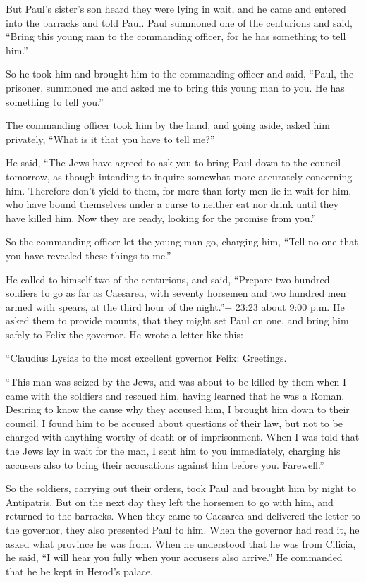  But Paul's sister's son heard they were lying in wait, and
he came and entered into the barracks and told Paul.  Paul
summoned one of the centurions and said, ``Bring this young man to the
commanding officer, for he has something to tell him.''

 So he took him and brought him to the commanding officer
and said, ``Paul, the prisoner, summoned me and asked me to bring this
young man to you. He has something to tell you.''

 The commanding officer took him by the hand, and going
aside, asked him privately, ``What is it that you have to tell me?''

 He said, ``The Jews have agreed to ask you to bring Paul
down to the council tomorrow, as though intending to inquire somewhat
more accurately concerning him.  Therefore don't yield to
them, for more than forty men lie in wait for him, who have bound
themselves under a curse to neither eat nor drink until they have killed
him. Now they are ready, looking for the promise from you.''

 So the commanding officer let the young man go, charging
him, ``Tell no one that you have revealed these things to me.''

 He called to himself two of the centurions, and said,
``Prepare two hundred soldiers to go as far as Caesarea, with seventy
horsemen and two hundred men armed with spears, at the third hour of the
night.''+ 23:23 about 9:00 p.m.  He asked them to provide
mounts, that they might set Paul on one, and bring him safely to Felix
the governor.  He wrote a letter like this:

 ``Claudius Lysias to the most excellent governor Felix:
Greetings.

 ``This man was seized by the Jews, and was about to be
killed by them when I came with the soldiers and rescued him, having
learned that he was a Roman.  Desiring to know the cause
why they accused him, I brought him down to their council. 
I found him to be accused about questions of their law, but not to be
charged with anything worthy of death or of imprisonment. 
When I was told that the Jews lay in wait for the man, I sent him to you
immediately, charging his accusers also to bring their accusations
against him before you. Farewell.''

 So the soldiers, carrying out their orders, took Paul and
brought him by night to Antipatris.  But on the next day
they left the horsemen to go with him, and returned to the barracks.
 When they came to Caesarea and delivered the letter to the
governor, they also presented Paul to him.  When the
governor had read it, he asked what province he was from. When he
understood that he was from Cilicia, he said,  ``I will
hear you fully when your accusers also arrive.'' He commanded that he be
kept in Herod's palace.

